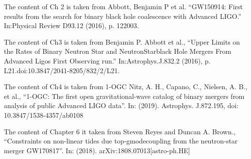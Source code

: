\documentclass[12pt,notitlepage]{report}
\begin{document}
The content of Ch 2 is taken from 
Abbott, Benjamin P et al. ``GW150914: First results from the search for binary black hole coalescence with Advanced LIGO.'' In:Physical Review D93.12 (2016), p. 122003.

The content of Ch3 is taken from 
Benjamin P. Abbott et al., ``Upper Limits on the Rates of Binary Neutron Star and NeutronStarblack Hole Mergers From Advanced Ligos First Observing run.'' In:Astrophys.J.832.2  (2016),  p.  L21.doi:10.3847/2041-8205/832/2/L21.

The content of Ch4 is taken from 1-OGC
Nitz, A. H., Capano, C., Nielsen, A. B., et al., ``1-OGC: The first open gravitational-wave catalog of binary mergers from analysis of public Advanced LIGO data''. In: (2019).
Astrophys. J.872.195, doi: 10.3847/1538-4357/ab0108

The content of Chapter 6 it taken from
Steven Reyes and Duncan A. Brown., ``Constraints on non-linear tides due top-gmodecoupling  from  the  neutron-star  merger  GW170817''.  In:  (2018).  arXiv:1808.07013[astro-ph.HE] 

\afterpreface


\label{ch:Introduction}


\label{ch:GW150914_PyCBC_Offline}


\label{ch:BNS_NSBH_Upper_Limits}


\label{ch:1_OGC}


\label{ch:Bayesian_data_analysis}


\label{ch:pg_modes}


\label{ch:conclusions}


%

\clearpage


\end{document}
